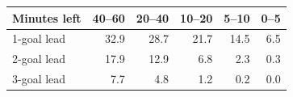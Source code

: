 \begin{tabular}{lrrrrr}\toprule
Minutes left & 40--60 & 20--40 & 10--20 & 5--10 & 0--5\\\midrule
1-goal lead & 32.9 & 28.7 & 21.7 & 14.5 & 6.5\\
2-goal lead & 17.9 & 12.9 & 6.8 & 2.3 & 0.3\\
3-goal lead & 7.7 & 4.8 & 1.2 & 0.2 & 0.0\\
\bottomrule\end{tabular}